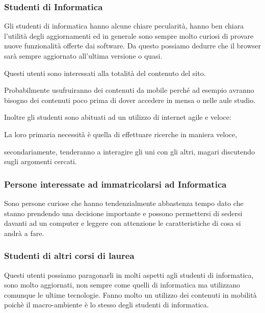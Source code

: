 \subsubsection{Studenti di Informatica}

Gli studenti di informatica hanno alcune chiare pecularità, hanno ben chiara l'utilità degli aggiornamenti ed in generale sono sempre molto curiosi di provare nuove funzionalità offerte dai software. Da questo possiamo dedurre che il browser sarà sempre aggiornato all'ultima versione o quasi.

Questi utenti sono interessati alla totalità del contenuto del sito.

Probabilmente usufruiranno dei contenuti da mobile perché ad esempio avranno bisogno dei contenuti poco prima di dover accedere in mensa o nelle aule studio.

Inoltre gli studenti sono abituati ad un utilizzo di internet agile e veloce:

La loro primaria necessità è quella di effettuare ricerche in maniera veloce, 

secondariamente, tenderanno a interagire gli uni con gli altri, magari discutendo sugli argomenti cercati.


\subsubsection{Persone interessate ad immatricolarsi ad Informatica}
Sono persone curiose che hanno tendenzialmente abbastenza tempo dato che stanno prendendo una decisione importante e possono permettersi di sedersi davanti ad un computer e leggere con attenzione le caratteristiche di cosa si andrà a fare.


\subsubsection{Studenti di altri corsi di laurea}
Questi utenti possiamo paragonarli in molti aspetti agli studenti di informatica, sono molto aggiornati, non sempre come quelli di informatica ma utilizzano comunque le ultime tecnologie. Fanno molto un utilizzo dei contenuti in mobilità poichè il macro-ambiente è lo stesso degli studenti di informatica.




